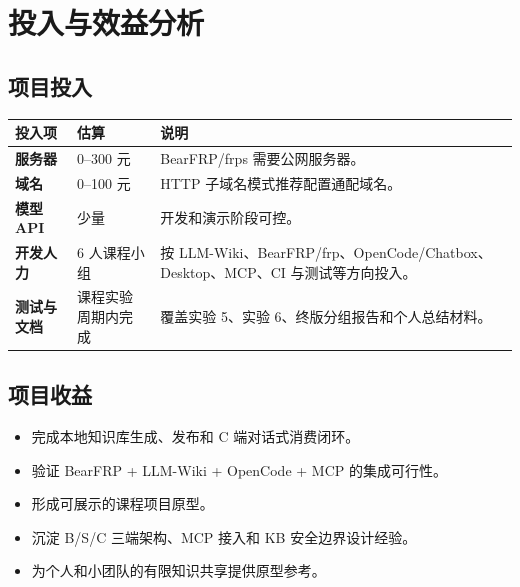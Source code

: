 \documentclass[UTF8,a4paper,12pt,fontset=fandol]{ctexart}
\begin{document}
\section{投入与效益分析}

\subsection{项目投入}
\begin{longtable}{>{\bfseries}p{3.2cm}p{3.0cm}p{8.0cm}}
\toprule
投入项 & 估算 & 说明 \\
\midrule
服务器 & 0--300 元 & BearFRP/frps 需要公网服务器。 \\
域名 & 0--100 元 & HTTP 子域名模式推荐配置通配域名。 \\
模型 API & 少量 & 开发和演示阶段可控。 \\
开发人力 & 6 人课程小组 & 按 LLM-Wiki、BearFRP/frp、OpenCode/Chatbox、Desktop、MCP、CI 与测试等方向投入。 \\
测试与文档 & 课程实验周期内完成 & 覆盖实验 5、实验 6、终版分组报告和个人总结材料。 \\
\bottomrule
\end{longtable}

\subsection{项目收益}
\begin{itemize}
  \item 完成本地知识库生成、发布和 C 端对话式消费闭环。
  \item 验证 BearFRP + LLM-Wiki + OpenCode + MCP 的集成可行性。
  \item 形成可展示的课程项目原型。
  \item 沉淀 B/S/C 三端架构、MCP 接入和 KB 安全边界设计经验。
  \item 为个人和小团队的有限知识共享提供原型参考。
\end{itemize}
\end{document}
